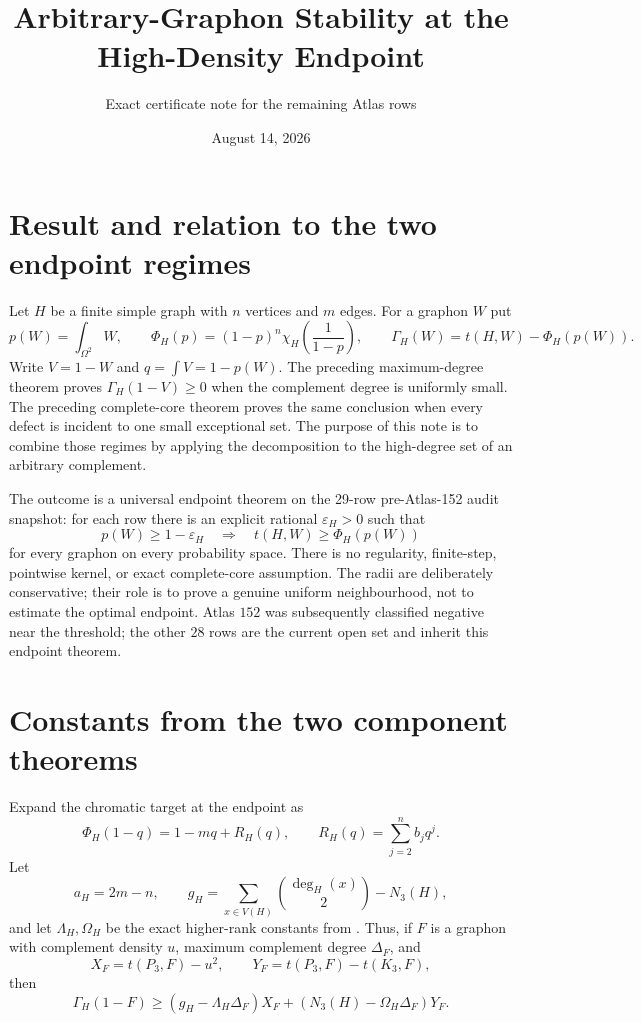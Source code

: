 \documentclass[11pt]{article}
\title{Arbitrary-Graphon Stability at the High-Density Endpoint}
\author{Exact certificate note for the remaining Atlas rows}
\date{August 14, 2026}
\newcommand{\GammaH}{\Gamma_H}
\begin{document}
\maketitle

\section{Result and relation to the two endpoint regimes}

Let $H$ be a finite simple graph with $n$ vertices and $m$ edges.  For a
graphon $W$ put
\[
 p(W)=\int_{\Omega^2}W,
 \qquad
 \Phi_H(p)=(1-p)^n\chi_H\!\left(\frac1{1-p}\right),
 \qquad
 \GammaH(W)=t(H,W)-\Phi_H(p(W)).
\]
Write $V=1-W$ and $q=\int V=1-p(W)$.  The preceding maximum-degree theorem
proves $\GammaH(1-V)\geq0$ when the complement degree is uniformly small.
The preceding complete-core theorem proves the same conclusion when every
defect is incident to one small exceptional set.  The purpose of this note is
to combine those regimes by applying the decomposition to the high-degree set
of an arbitrary complement.

The outcome is a universal endpoint theorem on the 29-row pre-Atlas-152
audit snapshot: for each row there is an explicit rational
$\varepsilon_H>0$ such that
\[
 p(W)\geq1-\varepsilon_H
 \quad\Longrightarrow\quad
 t(H,W)\geq\Phi_H(p(W))
\]
for every graphon on every probability space.  There is no regularity,
finite-step, pointwise kernel, or exact complete-core assumption.  The radii
are deliberately conservative; their role is to prove a genuine uniform
neighbourhood, not to estimate the optimal endpoint.
Atlas $152$ was subsequently classified negative near the threshold; the
other $28$ rows are the current open set and inherit this endpoint theorem.

\section{Constants from the two component theorems}

Expand the chromatic target at the endpoint as
\begin{equation}
 \Phi_H(1-q)=1-mq+R_H(q),
 \qquad
 R_H(q)=\sum_{j=2}^{n}b_jq^j.
 \label{eq:target}
\end{equation}
Let
\[
 a_H=2m-n,
 \qquad
 g_H=\sum_{x\in V(H)}\binom{\deg_H(x)}2-N_3(H),
\]
and let $\Lambda_H,\Omega_H$ be the exact higher-rank constants from
.  Thus, if
$F$ is a graphon with complement density $u$, maximum complement degree
$\Delta_F$, and
\[
 X_F=t(P_3,F)-u^2,
 \qquad
 Y_F=t(P_3,F)-t(K_3,F),
\]
then
\begin{equation}
 \GammaH(1-F)\geq
 (g_H-\Lambda_H\Delta_F)X_F
 +(N_3(H)-\Omega_H\Delta_F)Y_F.
 \label{eq:max-degree}
\end{equation}
\end{document}
